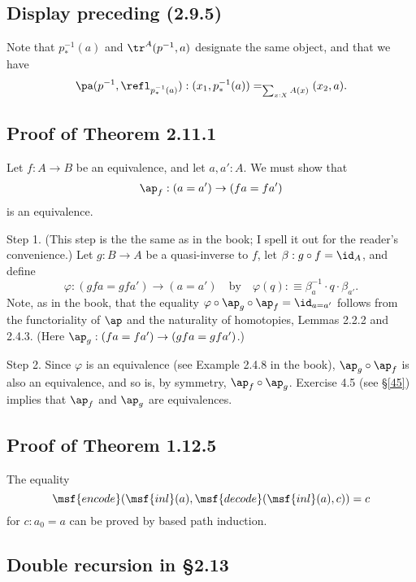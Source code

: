 \documentclass[12pt]{article}
\begin{document}

\subsection{Display preceding (2.9.5)}

Note that $p^{-1}_*(a)$ and $\tr^A(p^{-1},a)$ designate the same object, and that we have 
$$
\pa(p^{-1},\refl_{p^{-1}_*(a)}):(x_1,p^{-1}_*(a))=_{\sum_{x:X}A(x)}(x_2,a).
$$


\subsection{Proof of Theorem 2.11.1}\label{2111}

Let $f:A\to B$ be an equivalence, and let $a,a':A$. We must show that 
$$
\ap_f:(a=a')\to (fa=fa')
$$ 
is an equivalence.

Step 1. (This step is the the same as in the book; I spell it out for the reader's convenience.) Let $g:B\to A$ be a quasi-inverse to $f$, let $\beta:g\circ f=\id_A$, and define 
$$
\varphi:(gfa=gfa')\to(a=a')\quad\text{by}\quad\varphi(q):\equiv\beta_a^{-1}\cdot q\cdot\beta_{a'}.
$$ 
Note, as in the book, that the equality $\varphi\circ\ap_g\circ\ap_f=\id_{a=a'}$ follows from the functoriality of $\ap$ and the naturality of homotopies, Lemmas 2.2.2 and 2.4.3. (Here $\ap_g:(fa=fa')\to (gfa=gfa')$.)

Step 2. Since $\varphi$ is an equivalence (see Example 2.4.8 in the book), $\ap_g\circ\ap_f$ is also an equivalence, and so is, by symmetry, $\ap_f\circ\ap_g$. Exercise 4.5 (see \S\ref{45}) implies that $\ap_f$ and $\ap_g$ are equivalences.



\subsection{Proof of Theorem 1.12.5}

The equality 
$$
\msf{encode}(\msf{inl}(a),\msf{decode}(\msf{inl}(a),c))=c
$$ 
for $c:a_0=a$ can be proved by based path induction.


\subsection{Double recursion in \S2.13}
\end{document}
